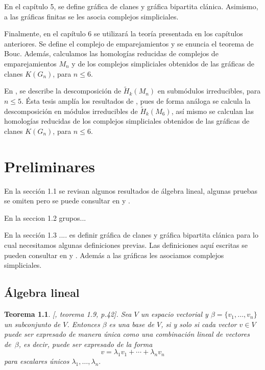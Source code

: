 \documentclass[12pt]{book}
\newtheorem{theorem}{Teorema}[section]
\theoremstyle{definition}
\newcounter{in}
\newcounter{ini}
\begin{document}
En el capítulo 5, se define gráfica de clanes y gráfica
bipartita clánica. Asimismo, a las gráficas finitas se les asocia complejos
simpliciales.

Finalmente, en el capítulo 6 se utilizará la teoría presentada en los
capítulos anteriores. Se define el complejo de emparejamientos y se
enuncia el teorema de Bouc.  Además, calculamos las homologías
reducidas de complejos de emparejamientos $M_{n}$ y de los complejos
simpliciales obtenidos de las gráficas de clanes $K(G_{n})$, para
$n\leq 6$.

En \cite{robles08:_repres}, se describe la descomposición de
$\widetilde H_{k}(M_{n})$ en submódulos irreducibles, para $n\leq
5$. Ésta tesis amplía los resultados de \cite{robles08:_repres}, pues
de forma análoga se calcula la descomposición en módulos
irreducibles de $\widetilde H_{k}(M_{6})$, así mismo se calculan las
homologías reducidas  de los complejos simpliciales obtenidos de las
gráficas de clanes $K(G_{n})$, para $n\leq 6$.

\tableofcontents


 \newpage \thispagestyle{empty}

\chapter{Preliminares}
\label{cha:repaso-algebra-lineal}

En la sección 1.1 se revisan algunos resultados de álgebra lineal, algunas
pruebas se omiten pero se puede consultar en
\cite{friedberg1982algebra} y \cite{herstein1990algebra}. 

En la seccion 1.2 grupos...

En la sección 1.3 .... es definir gráfica de clanes y gráfica
bipartita clánica para lo cual necesitamos algunas definiciones previas. Las definiciones aquí
escritas se pueden consultar en \cite{harary} y \cite{LPV08a}. Además
a las gráficas les asociamos complejos simpliciales.


\section{Álgebra lineal}
\label{esp-vec}

\begin{theorem}{[\cite{friedberg1982algebra}, teorema 1.9, p.42]}.
  \label{clunica}
  Sea $V$ un espacio vectorial y $\beta=\{v_{1},\dots,v_{n}\}$ un
  subconjunto de $V$. Entonces $\beta$ es una base de $V$, si y solo si
  cada vector $v\in V$ puede ser expresado de manera única como una
  combinación lineal de vectores de~$\beta$, es decir, puede ser
  expresado de la forma
  $$v=\lambda_{1}v_{1}+\cdots+\lambda_{n}v_{n}$$
  para escalares únicos $\lambda_{1},\ldots,\lambda_{n}.$
\end{theorem}
\end{document}
